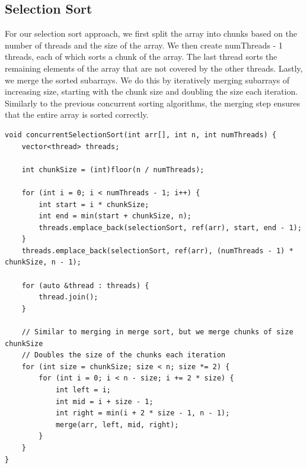 \documentclass[conference]{IEEEtran}
\begin{document}
\subsection{Selection Sort}
For our selection sort approach, we first split the array into chunks based on the number of threads and the size of the array. We then create numThreads - 1 threads, each of which sorts a chunk of the array. The last thread sorts the remaining elements of the array that are not covered by the other threads. Lastly, we merge the sorted subarrays. We do this by iteratively merging subarrays of increasing size, starting with the chunk size and doubling the size each iteration. Similarly to the previous concurrent sorting algorithms, the merging step ensures that the entire array is sorted correctly.
\\
\begin{lstlisting}
void concurrentSelectionSort(int arr[], int n, int numThreads) {
    vector<thread> threads;

    int chunkSize = (int)floor(n / numThreads);

    for (int i = 0; i < numThreads - 1; i++) {
        int start = i * chunkSize;
        int end = min(start + chunkSize, n);
        threads.emplace_back(selectionSort, ref(arr), start, end - 1);
    }
    threads.emplace_back(selectionSort, ref(arr), (numThreads - 1) * chunkSize, n - 1);
    
    for (auto &thread : threads) {
        thread.join();
    }

    // Similar to merging in merge sort, but we merge chunks of size chunkSize
    // Doubles the size of the chunks each iteration
    for (int size = chunkSize; size < n; size *= 2) {
        for (int i = 0; i < n - size; i += 2 * size) {
            int left = i;
            int mid = i + size - 1;
            int right = min(i + 2 * size - 1, n - 1);
            merge(arr, left, mid, right);
        }
    }
}
\end{lstlisting}
\end{document}
